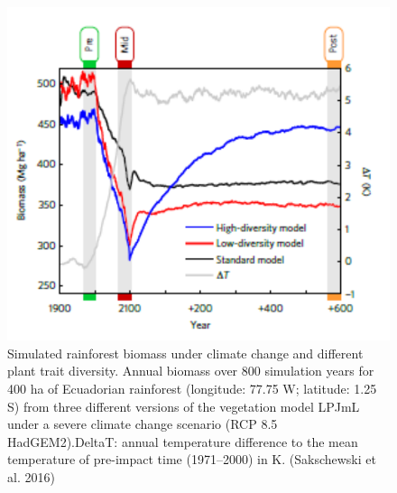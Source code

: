 \documentclass[12pt,oneside]{book}
\begin{document}
\begin{figure}

{\centering \includegraphics[width=0.8\linewidth]{figures/chap7/f720_lpjML_1} 

}

\caption{Simulated rainforest biomass under climate change and different plant trait diversity. Annual biomass over 800 simulation years for 400 ha of Ecuadorian rainforest (longitude: 77.75 W; latitude: 1.25 S) from three different versions of the vegetation model LPJmL under a severe climate change scenario (RCP 8.5 HadGEM2).DeltaT: annual temperature difference to the mean temperature of pre-impact time (1971–2000) in K. (Sakschewski et al. 2016)}\label{fig:f720}
\end{figure}
\end{document}
